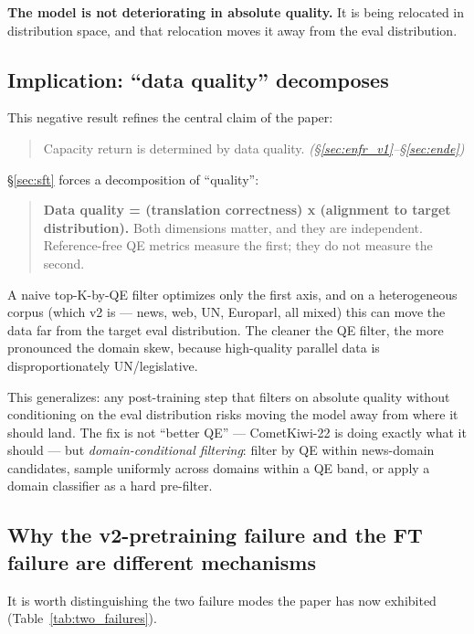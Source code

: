 \textbf{The model is not deteriorating in absolute quality.} It is being relocated in distribution space, and that relocation moves it away from the eval distribution.

\subsection{Implication: ``data quality'' decomposes}
This negative result refines the central claim of the paper:
\begin{quote}
Capacity return is determined by data quality. \emph{(\S\ref{sec:enfr_v1}--\S\ref{sec:ende})}
\end{quote}
\S\ref{sec:sft} forces a decomposition of ``quality'':
\begin{quote}
\textbf{Data quality = (translation correctness) x (alignment to target distribution).}
Both dimensions matter, and they are independent. Reference-free QE metrics measure the first; they do not measure the second.
\end{quote}

A naive top-K-by-QE filter optimizes only the first axis, and on a heterogeneous corpus (which v2 is --- news, web, UN, Europarl, all mixed) this can move the data far from the target eval distribution. The cleaner the QE filter, the more pronounced the domain skew, because high-quality parallel data is disproportionately UN/legislative.

This generalizes: any post-training step that filters on absolute quality without conditioning on the eval distribution risks moving the model away from where it should land. The fix is not ``better QE'' --- CometKiwi-22 is doing exactly what it should --- but \emph{domain-conditional filtering}: filter by QE within news-domain candidates, sample uniformly across domains within a QE band, or apply a domain classifier as a hard pre-filter.

\subsection{Why the v2-pretraining failure and the FT failure are different mechanisms}
\label{sec:why_failures_differ}

It is worth distinguishing the two failure modes the paper has now exhibited (Table~\ref{tab:two_failures}).

